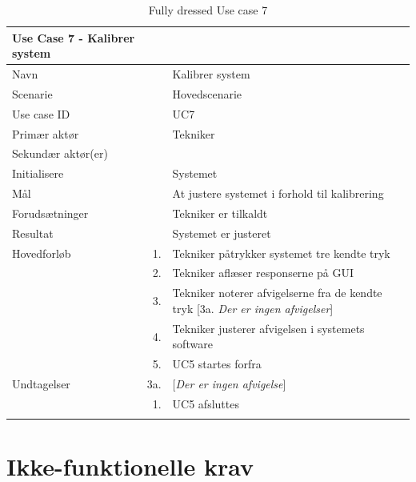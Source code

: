 
\begin{longtabu} to 
\toprule
    {\large \textbf{Use Case 7 - Kalibrer system}} && \\
    \toprule
    Navn &&    Kalibrer system\\
    Scenarie &&    Hovedscenarie\\
    Use case ID &&    UC7\\
    Primær aktør &&    Tekniker\\
    Sekundær aktør(er) &&    \\
    Initialisere &&    Systemet\\
    Mål &&    At justere systemet i forhold til kalibrering\\
    Forudsætninger &&    Tekniker er tilkaldt\\
    Resultat &&    Systemet er justeret\\
    \toprule
    Hovedforløb &    1. &    Tekniker påtrykker systemet tre kendte tryk\\[-1ex]
                &    2. &   Tekniker aflæser responserne på GUI\\[-1ex]
                &    3. &    Tekniker noterer afvigelserne fra de kendte tryk\newline
                             [3a. \textit{Der er ingen afvigelser}]\\[-1ex]
                &    4. &   Tekniker justerer afvigelsen i systemets software\\[-1ex]
               &	5.	&	UC5 startes forfra\\[-1ex]
    \toprule
    Undtagelser &    3a. &    [\textit{Der er ingen afvigelse}]\\[-1ex]
    &	1.	&	UC5 afsluttes\\
                \toprule
\caption{Fully dressed Use case 7}
\label{UC7}
\end{longtabu}
\newpage


\section{Ikke-funktionelle krav}

